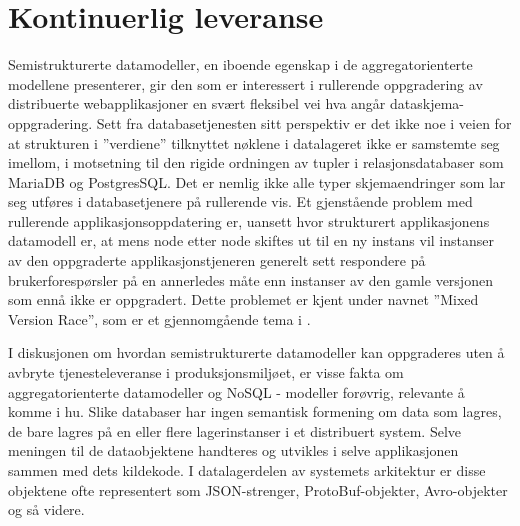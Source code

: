 \section{Kontinuerlig leveranse}


Semistrukturerte datamodeller, en iboende egenskap i de aggregatorienterte modellene \cite{sadalage2013} presenterer, gir den som er interessert i rullerende oppgradering av distribuerte webapplikasjoner en svært fleksibel vei hva angår dataskjema-oppgradering. Sett fra databasetjenesten sitt perspektiv er det ikke noe i veien for at strukturen i ''verdiene'' tilknyttet nøklene i datalageret ikke er samstemte seg imellom, i motsetning til den rigide ordningen av tupler i relasjonsdatabaser som MariaDB og PostgresSQL. Det er nemlig ikke alle typer skjemaendringer som lar seg utføres i databasetjenere på rullerende vis. Et gjenstående problem med rullerende applikasjonsoppdatering er, uansett hvor strukturert applikasjonens datamodell er, at mens node etter node skiftes ut til en ny instans vil instanser av den oppgraderte applikasjonstjeneren generelt sett respondere på brukerforespørsler på en annerledes måte enn instanser av den gamle versjonen som ennå ikke er oppgradert. Dette problemet er kjent under navnet ''Mixed Version Race'', som er et gjennomgående tema i \cite{dumitras2010upgrade,dumitracs2009upgrades}.

I diskusjonen om hvordan semistrukturerte datamodeller kan oppgraderes uten å avbryte tjenesteleveranse i produksjonsmiljøet, er visse fakta om aggregatorienterte datamodeller og NoSQL - modeller forøvrig, relevante å komme i hu. Slike databaser har ingen semantisk formening om data som lagres, de bare lagres på en eller flere lagerinstanser i et distribuert system. Selve meningen til de dataobjektene handteres og utvikles i selve applikasjonen sammen med dets kildekode. I datalagerdelen av systemets arkitektur er disse objektene ofte representert som JSON-strenger, ProtoBuf-objekter, Avro-objekter og så videre.

